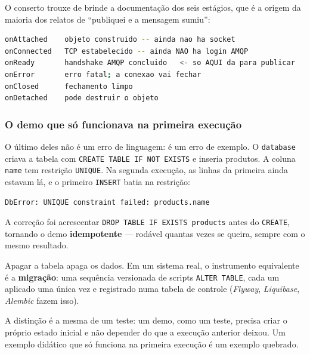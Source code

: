O conserto trouxe de brinde a documentação dos seis estágios, que é a origem da
maioria dos relatos de ``publiquei e a mensagem sumiu'':

\begin{lstlisting}[style=bt, language=bash, caption={Os seis estágios do ciclo
    de vida de uma conexão AMQP, resumo de
    \texttt{src/rabbitmq/handler.hpp}. Publicar antes do \texttt{onReady} é
    cedo demais.}]
onAttached    objeto construido -- ainda nao ha socket
onConnected   TCP estabelecido -- ainda NAO ha login AMQP
onReady       handshake AMQP concluido   <- so AQUI da para publicar
onError       erro fatal; a conexao vai fechar
onClosed      fechamento limpo
onDetached    pode destruir o objeto
\end{lstlisting}

\subsubsection{O demo que só funcionava na primeira execução}

O último deles não é um erro de linguagem: é um erro de exemplo. O
\texttt{database} criava a tabela com \texttt{CREATE TABLE IF NOT EXISTS} e
inseria produtos. A coluna \texttt{name} tem restrição \texttt{UNIQUE}. Na
segunda execução, as linhas da primeira ainda estavam lá, e o primeiro
\texttt{INSERT} batia na restrição:

\begin{lstlisting}[style=bt, language=bash, caption={O erro da segunda execução
    de \texttt{./dist/bin/database}, antes da correção. O programa saía com
    código~1.}]
DbError: UNIQUE constraint failed: products.name
\end{lstlisting}

A correção foi acrescentar \texttt{DROP TABLE IF EXISTS products} antes do
\texttt{CREATE}, tornando o demo \textbf{idempotente} --- rodável quantas vezes
se queira, sempre com o mesmo resultado.

\begin{armadilha}
Apagar a tabela apaga os dados. Em um sistema real, o instrumento equivalente é
a \textbf{migração}: uma sequência versionada de scripts \texttt{ALTER TABLE},
cada um aplicado uma única vez e registrado numa tabela de controle
(\emph{Flyway}, \emph{Liquibase}, \emph{Alembic} fazem isso).

A distinção é a mesma de um teste: um demo, como um teste, precisa criar o
próprio estado inicial e não depender do que a execução anterior deixou. Um
exemplo didático que só funciona na primeira execução é um exemplo quebrado.
\end{armadilha}

